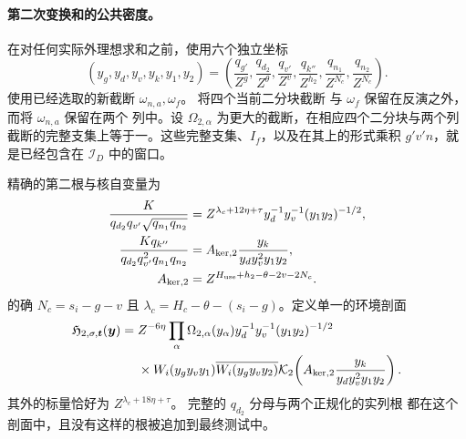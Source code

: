 \paragraph{第二次变换和的公共密度。}
在对任何实际外理想求和之前，使用六个独立坐标
\[
 (y_g,y_d,y_v,y_k,y_1,y_2)
 =\left(\frac{q_{g'}}{Z^g},\frac{q_{d_2}}{Z^\theta},
 \frac{q_{v'}}{Z^v},\frac{q_{k''}}{Z^{h_2}},
 \frac{q_{n_1}}{Z^{N_c}},\frac{q_{n_2}}{Z^{N_c}}\right).
\]
使用已经选取的新截断 \(\omega_{n,a},\omega_f\)。
将四个当前二分块截断
与 \(\omega_f\) 保留在反演之外，而将 \(\omega_{n,a}\) 保留在两个
列中。设 \(\Omega_{2,\alpha}\) 为更大的截断，在相应四个二分块与两个列
截断的完整支集上等于一。这些完整支集、\(I_f\)，以及在其上的形式乘积
\(g'v'n\)，就是已经包含在 \(\mathcal I_D\) 中的窗口。

精确的第二根与核自变量为
\begin{equation}\label{eq:inverse-second-root-kernel}
 \begin{split}
 \frac{K}{q_{d_2}q_{v'}\sqrt{q_{n_1}q_{n_2}}}
 &=Z^{\lambda_c+12\eta+\tau}y_d^{-1}y_v^{-1}(y_1y_2)^{-1/2},\\
 \frac{Kq_{k''}}{q_{d_2}q_{v'}^2q_{n_1}q_{n_2}}
 &=A_{{\rm ker},2}\frac{y_k}{y_dy_v^2y_1y_2},\\
 A_{{\rm ker},2}&=Z^{H_{\rm use}+h_2-\theta-2v-2N_c}.
 \end{split}
\end{equation}
的确 \(N_c=s_i-g-v\) 且
\(\lambda_c=H_c-\theta-(s_i-g)\)。定义单一的环境剖面
\begin{equation}\label{eq:inverse-second-profile}
 \begin{split}
 \mathfrak H_{2,\sigma,\boldsymbol t}(\boldsymbol y)={}&Z^{-6\eta}
 \prod_\alpha\Omega_{2,\alpha}(y_\alpha)
 y_d^{-1}y_v^{-1}(y_1y_2)^{-1/2}\\
 &\times W_i(y_gy_vy_1)\overline{W_i(y_gy_vy_2)}
 \mathcal K_2\!\left(A_{{\rm ker},2}\frac{y_k}{y_dy_v^2y_1y_2}\right).
 \end{split}
\end{equation}
其外的标量恰好为 \(Z^{\lambda_c+18\eta+\tau}\)。
完整的 \(q_{d_2}\) 分母与两个正规化的实列根
都在这个剖面中，且没有这样的根被追加到最终测试中。

